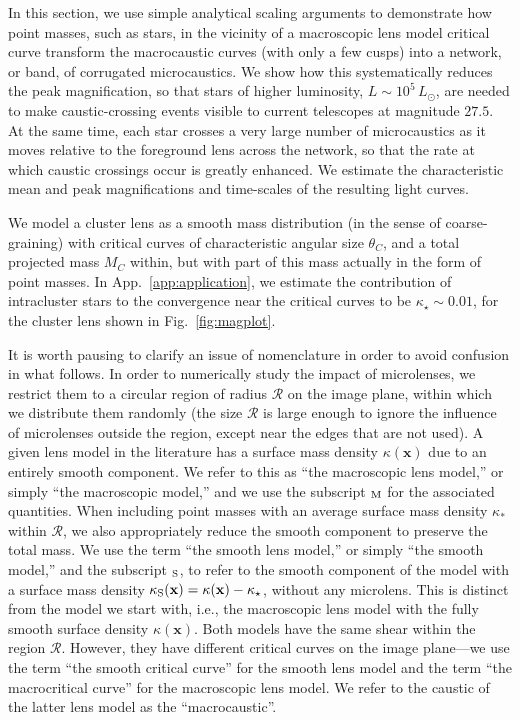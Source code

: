 \documentclass{aastex6}
\newcommand{\bt}[1]{\mathbf #1}
\newcommand{\reffig}[1]{Fig.~\ref{fig:#1}}
\newcommand{\refapp}[1]{App.~\ref{app:#1}}
\begin{document}
In this section, we use simple analytical scaling arguments to demonstrate how point masses, such as stars, in the vicinity of a macroscopic lens model critical curve transform the macrocaustic curves (with only a few cusps) into a network, or band, of corrugated microcaustics. We show how this systematically reduces the peak magnification, so that stars of higher luminosity, $L \sim 10^5\,L_\odot$, are needed to make caustic-crossing events visible to current telescopes at magnitude $27.5$. At the same time, each star crosses a very large number of microcaustics as it moves relative to the foreground lens across the network, so that the rate at which caustic crossings occur is greatly enhanced. We estimate the characteristic mean and peak magnifications and time-scales of the resulting light curves.

We model a cluster lens as a smooth mass distribution (in the sense of coarse-graining) with critical curves of characteristic angular size $\theta_C$, and a total projected mass $M_C$ within, but with part of this mass actually in the form of point masses. In \refapp{application}, we estimate the contribution of intracluster stars to the convergence near the critical curves to be $\kappa_\star\sim 0.01$, for the cluster lens shown in \reffig{magplot}.

It is worth pausing to clarify an issue of nomenclature in order to avoid confusion in what follows. In order to numerically study the impact of microlenses, we restrict them to a circular region of radius $\mathcal{R}$ on the image plane, within which we distribute them randomly (the size $\mathcal{R}$ is large enough to ignore the influence of microlenses outside the region, except near the edges that are not used). A given lens model in the literature has a surface mass density $\kappa(\bt x)$ due to an entirely smooth component. We refer to this as ``the macroscopic lens model,'' or simply ``the macroscopic model,'' and we use the subscript ${}_{\rm M}$ for the associated quantities. When including point masses with an average surface mass density $\kappa_*$ within $\mathcal{R}$, we also appropriately reduce the smooth component to preserve the total mass. We use the term ``the smooth lens model,'' or simply ``the smooth model,'' and the subscript ${}_{\rm S}$, to refer to the smooth component of the model with a surface mass density $\kappa_{\rm S}(\bt x) = \kappa(\bt x) - \kappa_\star$, without any microlens. This is distinct from the model we start with, i.e., the macroscopic lens model with the fully smooth surface density $\kappa(\bt x)$. Both models have the same shear within the region $\mathcal{R}$. However, they have different critical curves on the image plane---we use the term ``the smooth critical curve'' for the smooth lens model and the term ``the macrocritical curve'' for the macroscopic lens model. We refer to the caustic of the latter lens model as the ``macrocaustic''.
\end{document}

